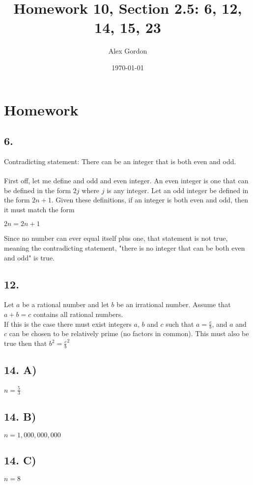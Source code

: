 \documentclass[12]{scrartcl}
\begin{document}
\title{Homework 10, Section 2.5: 6, 12, 14, 15, 23}
\author{Alex Gordon}
\date{\today}
\maketitle
\section*{Homework}
\subsection*{6.}
Contradicting statement: There can be an integer that is both even and odd. \\ \\
First off, let me define and odd and even integer. An even integer is one that can be defined in the form $2j$ where $j$ is any integer. Let an odd integer be defined in the form $2n + 1$. Given these definitions, if an integer is both even and odd, then it must match the form\\
\begin{center}$2n = 2n+1$\end{center} 
Since no number can ever equal itself plus one, that statement is not true, meaning the contradicting statement, "there is no integer that can be both even and odd" is true. 
\subsection*{12.}
Let $a$ be a rational number and let $b$ be an irrational number. Assume that $a + b = c$ contains all rational numbers. 
\\
If this is the case there must exist integers $a$, $b$ and $c$ such that $a = \frac{c}{b}$, and $a$ and $c$ can be chosen to be relatively prime (no factors in common). This must also be true then that $b^2 = \frac{c}{b}^2$
\subsection*{14. A)}
\begin{center}$n = \frac{5}{3}$\end{center}
\subsection*{14. B)}
\begin{center}$n = 1,000,000,000$\end{center}
\subsection*{14. C)}
\begin{center}$n = 8$\end{center}
\end{document}
